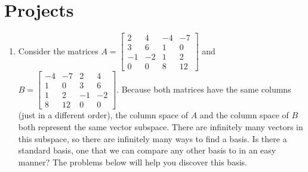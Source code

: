 \section{Projects}
\begin{enumerate}

%
%



	\item Consider the matrices
$A=
\begin{bmatrix}
 2 & 4 & -4 & -7 \\
 3 & 6 & 1 & 0 \\
 -1 & -2 & 1 & 2 \\
 0 & 0 & 8 & 12
\end{bmatrix}
$ and 
$B=
\begin{bmatrix}
 -4 & -7 & 2 & 4 \\
 1 & 0& 3 & 6  \\
 1 & 2& -1 & -2  \\
 8 & 12& 0 & 0 
\end{bmatrix}
$. Because both matrices have the same columns (just in a different order), the column space of $A$ and the column space of $B$ both represent the same vector subspace. There are infinitely many vectors in this subspace, so there are infinitely many ways to find a basis. Is there a standard basis, one that we can compare any other basis to in an easy manner?  The problems below will help you discover this basis.


\end{enumerate}
